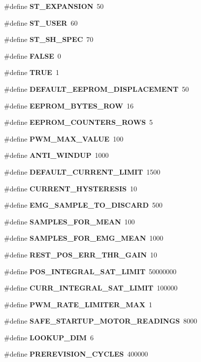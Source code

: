 \begin{DoxyCompactItemize}
\#define {\bfseries S\+T\+\_\+\+E\+X\+P\+A\+N\+S\+I\+ON}~50
\item 
\mbox{\label{globals_8h_a16d74d98ce4fcdfb20501e89e37ff053}} 
\#define {\bfseries S\+T\+\_\+\+U\+S\+ER}~60
\item 
\mbox{\label{globals_8h_a788bae111bb48b9aa005ecf765ce1e94}} 
\#define {\bfseries S\+T\+\_\+\+S\+H\+\_\+\+S\+P\+EC}~70
\item 
\mbox{\label{globals_8h_aa93f0eb578d23995850d61f7d61c55c1}} 
\#define {\bfseries F\+A\+L\+SE}~0
\item 
\mbox{\label{globals_8h_aa8cecfc5c5c054d2875c03e77b7be15d}} 
\#define {\bfseries T\+R\+UE}~1
\item 
\#define \textbf{ D\+E\+F\+A\+U\+L\+T\+\_\+\+E\+E\+P\+R\+O\+M\+\_\+\+D\+I\+S\+P\+L\+A\+C\+E\+M\+E\+NT}~50
\item 
\#define \textbf{ E\+E\+P\+R\+O\+M\+\_\+\+B\+Y\+T\+E\+S\+\_\+\+R\+OW}~16
\item 
\#define \textbf{ E\+E\+P\+R\+O\+M\+\_\+\+C\+O\+U\+N\+T\+E\+R\+S\+\_\+\+R\+O\+WS}~5
\item 
\#define \textbf{ P\+W\+M\+\_\+\+M\+A\+X\+\_\+\+V\+A\+L\+UE}~100
\item 
\#define \textbf{ A\+N\+T\+I\+\_\+\+W\+I\+N\+D\+UP}~1000
\item 
\#define \textbf{ D\+E\+F\+A\+U\+L\+T\+\_\+\+C\+U\+R\+R\+E\+N\+T\+\_\+\+L\+I\+M\+IT}~1500
\item 
\#define \textbf{ C\+U\+R\+R\+E\+N\+T\+\_\+\+H\+Y\+S\+T\+E\+R\+E\+S\+IS}~10
\item 
\#define \textbf{ E\+M\+G\+\_\+\+S\+A\+M\+P\+L\+E\+\_\+\+T\+O\+\_\+\+D\+I\+S\+C\+A\+RD}~500
\item 
\#define \textbf{ S\+A\+M\+P\+L\+E\+S\+\_\+\+F\+O\+R\+\_\+\+M\+E\+AN}~100
\item 
\#define \textbf{ S\+A\+M\+P\+L\+E\+S\+\_\+\+F\+O\+R\+\_\+\+E\+M\+G\+\_\+\+M\+E\+AN}~1000
\item 
\#define \textbf{ R\+E\+S\+T\+\_\+\+P\+O\+S\+\_\+\+E\+R\+R\+\_\+\+T\+H\+R\+\_\+\+G\+A\+IN}~10
\item 
\#define \textbf{ P\+O\+S\+\_\+\+I\+N\+T\+E\+G\+R\+A\+L\+\_\+\+S\+A\+T\+\_\+\+L\+I\+M\+IT}~50000000
\item 
\#define \textbf{ C\+U\+R\+R\+\_\+\+I\+N\+T\+E\+G\+R\+A\+L\+\_\+\+S\+A\+T\+\_\+\+L\+I\+M\+IT}~100000
\item 
\mbox{\label{globals_8h_adf1a94447aeafa5087c7190375b7ccd9}} 
\#define {\bfseries P\+W\+M\+\_\+\+R\+A\+T\+E\+\_\+\+L\+I\+M\+I\+T\+E\+R\+\_\+\+M\+AX}~1
\item 
\#define \textbf{ S\+A\+F\+E\+\_\+\+S\+T\+A\+R\+T\+U\+P\+\_\+\+M\+O\+T\+O\+R\+\_\+\+R\+E\+A\+D\+I\+N\+GS}~8000
\item 
\#define \textbf{ L\+O\+O\+K\+U\+P\+\_\+\+D\+IM}~6
\item 
\#define \textbf{ P\+R\+E\+R\+E\+V\+I\+S\+I\+O\+N\+\_\+\+C\+Y\+C\+L\+ES}~400000
\end{DoxyCompactItemize}
